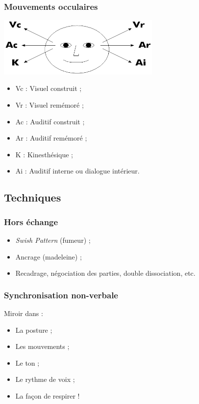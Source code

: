 \documentclass{beamer}
\begin{document}
\begin{frame}
\frametitle{Mouvements occulaires}
	\begin{center}
		\includegraphics[width=8cm]{yeux.jpg}
	\end{center}
	\begin{itemize}
		\item<+-> Vc : Visuel construit ;
		\item<+-> Vr : Visuel remémoré ;
		\item<+-> Ac : Auditif construit ;
		\item<+-> Ar : Auditif remémoré ;
		\item<+-> K : Kinesthésique ;
		\item<+-> Ai : Auditif interne ou dialogue intérieur.
	\end{itemize}
\end{frame}

\subsection{Techniques}

\begin{frame}
\frametitle{Hors échange}
	\begin{itemize}
		\item \emph{Swish Pattern} (fumeur) ;
		\item Ancrage (madeleine) ;
		\item Recadrage, négociation des parties, double dissociation, etc.
	\end{itemize}
\end{frame}

\begin{frame}
\frametitle{Synchronisation non-verbale}
	Miroir dans :
	\begin{itemize}
		\item La posture ;
		\item Les mouvements ;
		\item Le ton ;
		\item Le rythme de voix ;
		\item La façon de respirer !
	\end{itemize}
\end{frame}
\end{document}
